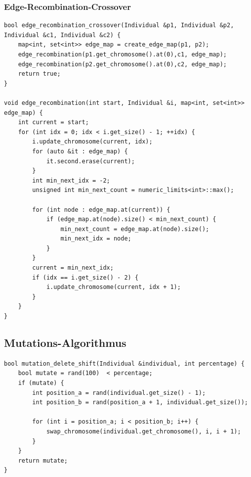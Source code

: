 \subsubsection{Edge-Recombination-Crossover}
\begin{minipage}{\linewidth}
\begin{lstlisting}[caption={Edge-Recombination-Crossover}, firstnumber=1, captionpos=b, label=lst:erx]
bool edge_recombination_crossover(Individual &p1, Individual &p2, Individual &c1, Individual &c2) {
	map<int, set<int>> edge_map = create_edge_map(p1, p2);
	edge_recombination(p1.get_chromosome().at(0),c1, edge_map);
	edge_recombination(p2.get_chromosome().at(0),c2, edge_map);
	return true;
}

void edge_recombination(int start, Individual &i, map<int, set<int>> edge_map) {
	int current = start;
	for (int idx = 0; idx < i.get_size() - 1; ++idx) {
		i.update_chromosome(current, idx);
		for (auto &it : edge_map) {
			it.second.erase(current);
		}
		int min_next_idx = -2;
		unsigned int min_next_count = numeric_limits<int>::max();

		for (int node : edge_map.at(current)) {
			if (edge_map.at(node).size() < min_next_count) {
				min_next_count = edge_map.at(node).size();
				min_next_idx = node;
			}
		}
		current = min_next_idx;
		if (idx == i.get_size() - 2) {
			i.update_chromosome(current, idx + 1);
		}
	}
}
\end{lstlisting}
\end{minipage}

\subsection{Mutations-Algorithmus}
\begin{minipage}{\linewidth}
\begin{lstlisting}[caption={Delete-Shift-Mutaions-Algorithmus}, firstnumber=1, captionpos=b, label=lst:mutation]
bool mutation_delete_shift(Individual &individual, int percentage) {
	bool mutate = rand(100)  < percentage;
	if (mutate) {
		int position_a = rand(individual.get_size() - 1);
		int position_b = rand(position_a + 1, individual.get_size());
 
		for (int i = position_a; i < position_b; i++) {
			swap_chromosome(individual.get_chromosome(), i, i + 1);
		}
	}
	return mutate;
}
\end{lstlisting}
\end{minipage}
